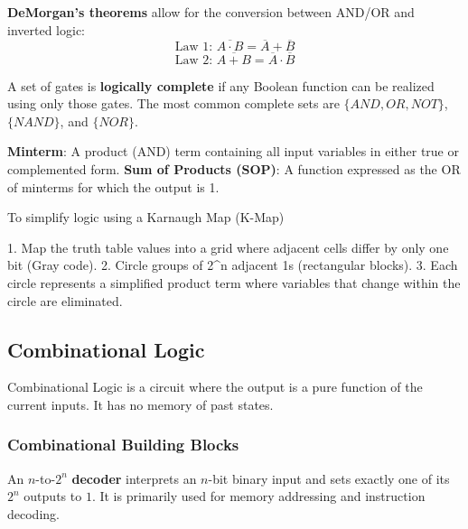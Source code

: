 \begin{theorem}
	\textbf{DeMorgan's theorems} allow for the conversion between AND/OR and inverted logic:
	$$\text{Law 1: } \overline{A \cdot B} = \overline{A} + \overline{B}$$
	$$\text{Law 2: } \overline{A + B} = \overline{A} \cdot \overline{B}$$
\end{theorem}

\begin{important}
	A set of gates is \textbf{logically complete} if any Boolean function can be realized using only those gates. The most common complete sets are $\{AND, OR, NOT\}$, $\{NAND\}$, and $\{NOR\}$.
\end{important}

\begin{definition}
	\textbf{Minterm}: A product (AND) term containing all input variables in either true or complemented form.
	\textbf{Sum of Products (SOP)}: A function expressed as the OR of minterms for which the output is 1.
\end{definition}

\begin{algorithm}
	To simplify logic using a Karnaugh Map (K-Map)

	1. Map the truth table values into a grid where adjacent cells differ by only one bit (Gray code).
	2. Circle groups of 2^n adjacent 1s (rectangular blocks).
	3. Each circle represents a simplified product term where variables that change within the circle are eliminated.
\end{algorithm}


\subsection{Combinational Logic}

\begin{definition}
	Combinational Logic is a circuit where the output is a pure function of the current inputs. It has no memory of past states.
\end{definition}

\subsubsection{Combinational Building Blocks}

\begin{definition}
	An $n$-to-$2^n$ \textbf{decoder} interprets an $n$-bit binary input and sets exactly one of its $2^n$ outputs to $1$. It is primarily used for memory addressing and instruction decoding.
\end{definition}

